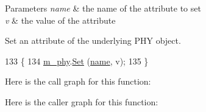 \begin{DoxyParams}{Parameters}
{\em name} & the name of the attribute to set \\
\hline
{\em v} & the value of the attribute\\
\hline
\end{DoxyParams}
Set an attribute of the underlying P\+HY object. 
\begin{DoxyCode}
133 \{
134   \hyperlink{classns3_1_1WifiPhyHelper_ae3b07648ffcc4ad9bd82087c826aaf1b}{m\_phy}.\hyperlink{classns3_1_1ObjectFactory_aef5c0d5019c96bdf01cefd1ff83f4a68}{Set} (\hyperlink{generate__test__data__lte__spectrum__model_8m_ab74e6bf80237ddc4109968cedc58c151}{name}, v);
135 \}
\end{DoxyCode}


Here is the call graph for this function\+:




Here is the caller graph for this function\+:


